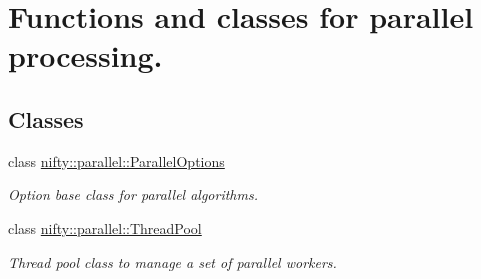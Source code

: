 \hypertarget{group__ParallelProcessing}{}\section{Functions and classes for parallel processing.}
\label{group__ParallelProcessing}
\subsection*{Classes}
\begin{DoxyCompactItemize}
\item 
class \hyperlink{classnifty_1_1parallel_1_1ParallelOptions}{nifty\+::parallel\+::\+Parallel\+Options}
\begin{DoxyCompactList}\small\item\em Option base class for parallel algorithms. \end{DoxyCompactList}\item 
class \hyperlink{classnifty_1_1parallel_1_1ThreadPool}{nifty\+::parallel\+::\+Thread\+Pool}
\begin{DoxyCompactList}\small\item\em Thread pool class to manage a set of parallel workers. \end{DoxyCompactList}\end{DoxyCompactItemize}
